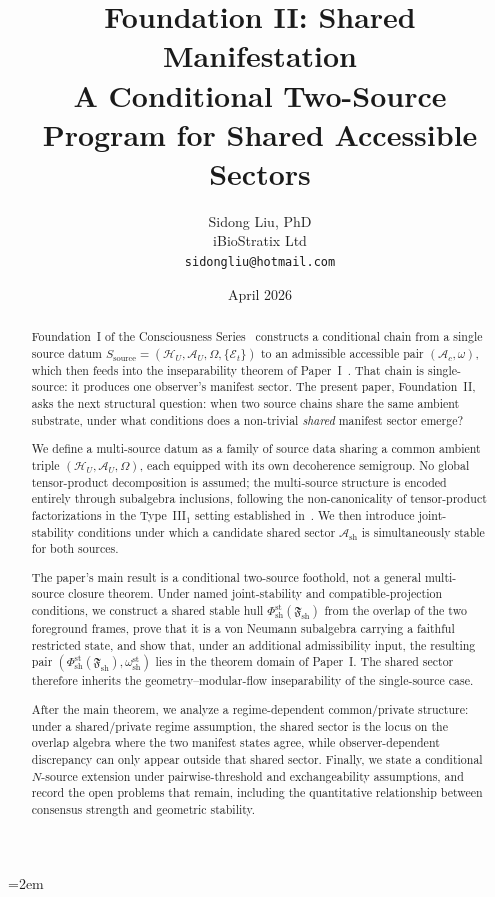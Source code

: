 \documentclass[12pt]{article}
\title{%
  \textbf{Foundation II: Shared Manifestation}\\
  \textbf{A Conditional Two-Source Program for Shared Accessible Sectors}%
}
\author{
  Sidong Liu, PhD \\
  \small iBioStratix Ltd \\
  \small \texttt{sidongliu@hotmail.com}
}
\date{April 2026}
\theoremstyle{definition}
\theoremstyle{remark}
\begin{document}
\emergencystretch=2em
\raggedbottom
{}

\maketitle

\begin{abstract}
Foundation~I of the Consciousness Series~\cite{FoundationI} constructs a
conditional chain from a single source datum
\(S_{\mathrm{source}}=(\mathcal H_U,\mathcal A_U,\Omega,\{\mathcal E_t\})\)
to an admissible accessible pair \((\mathcal A_c,\omega)\), which then
feeds into the inseparability theorem of Paper~I~\cite{PaperI}. That
chain is single-source: it produces one observer's manifest sector. The
present paper, Foundation~II, asks the next structural question: when two
source chains share the same ambient substrate, under what conditions
does a non-trivial \emph{shared} manifest sector emerge?

We define a multi-source datum as a family of source data sharing a
common ambient triple \((\mathcal H_U,\mathcal A_U,\Omega)\), each
equipped with its own decoherence semigroup. No global tensor-product
decomposition is assumed; the multi-source structure is encoded entirely
through subalgebra inclusions, following the non-canonicality of
tensor-product factorizations in the Type~III\(_1\) setting established
in~\cite{HAFFA}. We then introduce joint-stability conditions under
which a candidate shared sector \(\mathcal A_{\mathrm{sh}}\) is
simultaneously stable for both sources.

The paper's main result is a conditional two-source foothold, not a
general multi-source closure theorem. Under named joint-stability and
compatible-projection conditions, we construct a
shared stable hull
\(\Phi_{\mathrm{sh}}^{\mathrm{st}}(\mathfrak F_{\mathrm{sh}})\) from
the overlap of the two foreground frames, prove that it is a von Neumann
subalgebra carrying a faithful restricted state, and show that, under an
additional admissibility input, the resulting pair
\((\Phi_{\mathrm{sh}}^{\mathrm{st}}(\mathfrak F_{\mathrm{sh}}),
\omega_{\mathrm{sh}}^{\mathrm{st}})\) lies in the theorem domain of
Paper~I. The
shared sector therefore inherits the
geometry--modular-flow inseparability of the single-source case.

After the main theorem, we analyze a regime-dependent common/private
structure: under a shared/private regime assumption, the shared sector
is the locus on the overlap algebra where the two manifest states agree,
while observer-dependent discrepancy can only appear outside that shared
sector. Finally, we state a conditional \(N\)-source extension under
pairwise-threshold and exchangeability assumptions, and record the open
problems that remain, including the quantitative relationship between
consensus strength and geometric stability.


\end{abstract}
\end{document}
